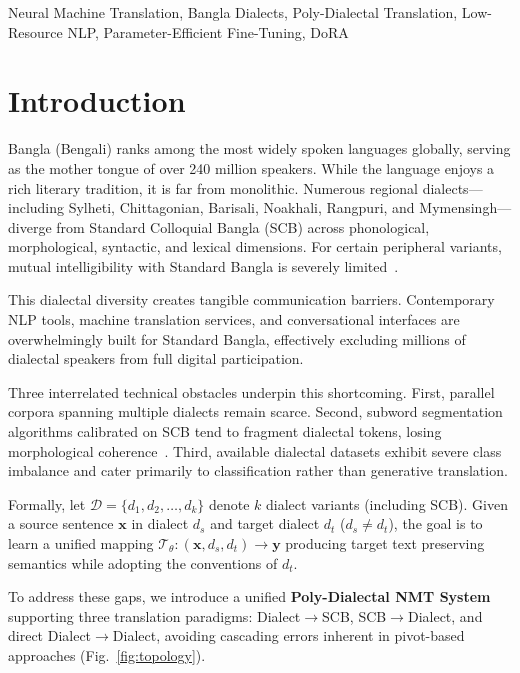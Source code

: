 \documentclass[conference]{IEEEtran}
\begin{document}
\begin{IEEEkeywords}
Neural Machine Translation, Bangla Dialects, Poly-Dialectal Translation, Low-Resource NLP, Parameter-Efficient Fine-Tuning, DoRA
\end{IEEEkeywords}

\section{Introduction}

Bangla (Bengali) ranks among the most widely spoken languages globally, serving as the mother tongue of over 240 million speakers. While the language enjoys a rich literary tradition, it is far from monolithic. Numerous regional dialects---including Sylheti, Chittagonian, Barisali, Noakhali, Rangpuri, and Mymensingh---diverge from Standard Colloquial Bangla (SCB) across phonological, morphological, syntactic, and lexical dimensions. For certain peripheral variants, mutual intelligibility with Standard Bangla is severely limited~\cite{faria2025vashantor}.

This dialectal diversity creates tangible communication barriers. Contemporary NLP tools, machine translation services, and conversational interfaces are overwhelmingly built for Standard Bangla, effectively excluding millions of dialectal speakers from full digital participation.

Three interrelated technical obstacles underpin this shortcoming. First, parallel corpora spanning multiple dialects remain scarce. Second, subword segmentation algorithms calibrated on SCB tend to fragment dialectal tokens, losing morphological coherence~\cite{sennrich2015neural, wu2016google}. Third, available dialectal datasets exhibit severe class imbalance and cater primarily to classification rather than generative translation.

Formally, let $\mathcal{D} = \{d_1, d_2, \ldots, d_k\}$ denote $k$ dialect variants (including SCB). Given a source sentence $\mathbf{x}$ in dialect $d_s$ and target dialect $d_t$ ($d_s \neq d_t$), the goal is to learn a unified mapping $\mathcal{T}_\theta: (\mathbf{x}, d_s, d_t) \rightarrow \mathbf{y}$ producing target text preserving semantics while adopting the conventions of $d_t$.

To address these gaps, we introduce a unified \textbf{Poly-Dialectal NMT System} supporting three translation paradigms: Dialect$\rightarrow$SCB, SCB$\rightarrow$Dialect, and direct Dialect$\rightarrow$Dialect, avoiding cascading errors inherent in pivot-based approaches (Fig.~\ref{fig:topology}).
\end{document}
